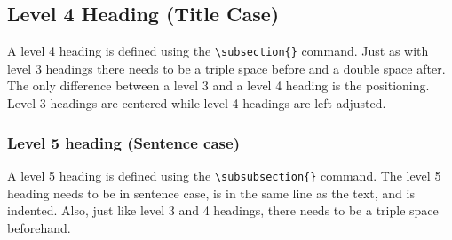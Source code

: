 \subsection{Level 4 Heading (Title Case)}

A level 4 heading is defined using the \verb|\subsection{}| command. Just as with level 3 headings there needs to be a triple space before and a double space after. The only difference between a level 3 and a level 4 heading is the positioning. Level 3 headings are centered while level 4 headings are left adjusted.

\subsubsection{Level 5 heading (Sentence case)}

A level 5 heading is defined using the \verb|\subsubsection{}| command. The level 5 heading needs to be in sentence case, is in the same line as the text, and is indented. Also, just like level 3 and 4 headings, there needs to be a triple space beforehand.


